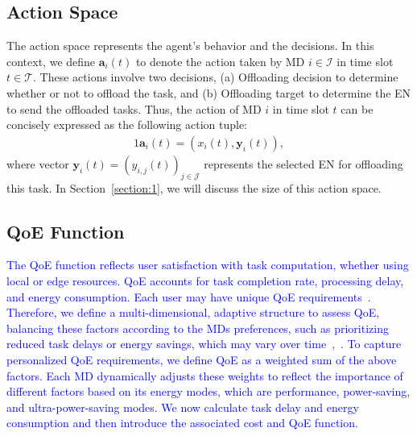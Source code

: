 \documentclass[10pt, journal,letterpaper]{IEEEtran}
\begin{document}
\subsection{Action Space}
The action space represents the agent's behavior and the decisions. In this context, we define $\boldsymbol{a}_i(t)$ to denote the action taken by MD $i \in \mathcal{I}$ in time slot $t \in \mathcal{T}$. These actions involve two decisions, (a) Offloading decision to determine whether or not to offload the task, and (b) Offloading target to determine the EN to send the offloaded tasks. Thus, the action of MD $i$ in time slot $t$ can be concisely expressed as the following action tuple: \vspace{-1.5mm}
\begin{alignat}{1}
	\boldsymbol{a}_i(t) = (x_i(t), \boldsymbol{y}_i(t)),
	\label{20}
\end{alignat}
where vector $\boldsymbol{y}_i(t)=(y_{i,j}(t))_{j \in \mathcal{J}}$ represents the selected EN for offloading this task. In Section~\ref{section:1}, we will discuss the size of this action space.




\subsection{QoE Function}
\textcolor{blue}{The QoE function reflects user satisfaction with task computation, whether using local or edge resources. QoE accounts for task completion rate, processing delay, and energy consumption. Each user may have unique QoE requirements~\cite{wang2017qoe}. Therefore, we define a multi-dimensional, adaptive structure to assess QoE, balancing these factors according to the MDs preferences, such as prioritizing reduced task delays or energy savings, which may vary over time~\cite{wang2019intelligent},~\cite{mehrabi2019energy}. To capture personalized QoE requirements, we define QoE as a weighted sum of the above factors. Each MD dynamically adjusts these weights to reflect the importance of different factors based on its energy modes, which are performance, power-saving, and ultra-power-saving modes. We now calculate task delay and energy consumption and then introduce the associated cost and QoE function.}
\end{document}
